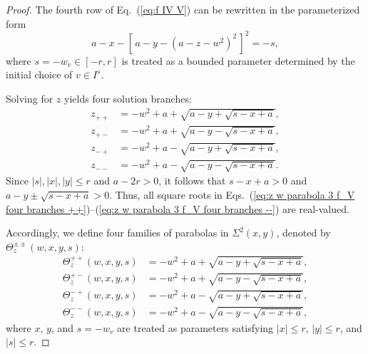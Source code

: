 \documentclass[12pt]{iopart}
\begin{document}
\begin{proof}
The fourth row of Eq.~(\ref{eq:f IV V}) can be rewritten in the parameterized form  
\begin{equation}\label{eq:z w parabola 3 f_V}
a - x - [\,a - y - (a - z - w^2)^2\,]^2 = -s,
\end{equation}  
where \( s = -w_v \in [-r,r] \) is treated as a bounded parameter determined by the initial choice of \( v \in I^s \).

Solving for \( z \) yields four solution branches:  
\begin{eqnarray}\label{eq:z w parabola 3 f_V four branches}
z_{++} &= -w^2 + a + \sqrt{a-y + \sqrt{s-x+a}}, \label{eq:z w parabola 3 f_V four branches ++} \\
z_{+-} &= -w^2 + a + \sqrt{a-y - \sqrt{s-x+a}}, \label{eq:z w parabola 3 f_V four branches +-} \\
z_{-+} &= -w^2 + a - \sqrt{a-y + \sqrt{s-x+a}}, \label{eq:z w parabola 3 f_V four branches -+} \\
z_{--} &= -w^2 + a - \sqrt{a-y - \sqrt{s-x+a}}. \label{eq:z w parabola 3 f_V four branches --}
\end{eqnarray}
Since \( |s|, |x|, |y| \leq r \) and \( a - 2r > 0 \), it follows that \( s - x + a > 0 \) and \( a - y \pm \sqrt{s-x+a} > 0 \).  
Thus, all square roots in Eqs.~(\ref{eq:z w parabola 3 f_V four branches ++})--(\ref{eq:z w parabola 3 f_V four branches --}) are real-valued.

Accordingly, we define four families of parabolas in \( \Sigma^2(x,y) \), denoted by \( \Theta_z^{\pm\pm}(w,x,y,s) \):  
\begin{eqnarray}
\Theta_z^{++}(w,x,y,s) &= -w^2 + a + \sqrt{a-y + \sqrt{s-x+a}}, \label{eq:Theta z in terms of w x y s ++} \\
\Theta_z^{+-}(w,x,y,s) &= -w^2 + a + \sqrt{a-y - \sqrt{s-x+a}}, \label{eq:Theta z in terms of w x y s +-} \\
\Theta_z^{-+}(w,x,y,s) &= -w^2 + a - \sqrt{a-y + \sqrt{s-x+a}}, \label{eq:Theta z in terms of w x y s -+} \\
\Theta_z^{--}(w,x,y,s) &= -w^2 + a - \sqrt{a-y - \sqrt{s-x+a}}, \label{eq:Theta z in terms of w x y s --}
\end{eqnarray}
where \( x \), \( y \), and \( s = -w_v \) are treated as parameters satisfying \( |x| \leq r \), \( |y| \leq r \), and \( |s| \leq r \).


\end{proof}
\end{document}
